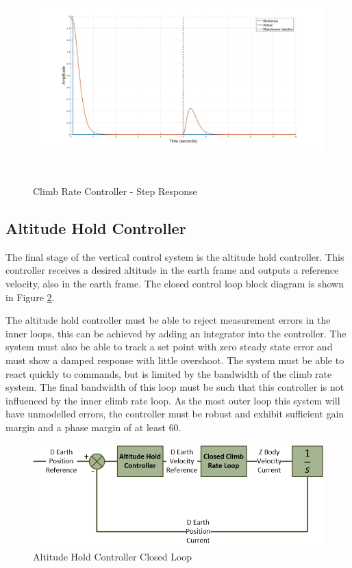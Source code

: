 		 \begin{figure}[H]
		 	\centering
		 	\includegraphics[height = 8cm]{../Design/Matlab/Controllers/climb_rate_step.jpg}
		 	\caption{Climb Rate Controller -  Step Response}
		 	\label{IM_ClimbRateStep}
		 \end{figure}
	 
	 \subsection{Altitude Hold Controller}
	 The final stage of the vertical control system is the altitude hold controller. This controller receives a desired altitude in the earth frame and outputs a reference velocity, also in the earth frame. The closed control loop block diagram is shown in Figure \ref{IM_AltHoldControlLoop}. 
	 
	 The altitude hold controller must be able to reject measurement errors in the inner loops, this can be achieved by adding an integrator into the controller. The system must also be able to track a set point with zero steady state error and must show a damped response with little overshoot. The system must be able to react quickly to commands, but is limited by the bandwidth of the climb rate system. The final bandwidth of this loop must be such that this controller is not influenced by the inner climb rate loop. As the most outer loop this system will have unmodelled errors, the controller must be robust and exhibit sufficient gain margin and a phase margin of at least $60$\textdegree.
	 
	 \begin{figure}[H]
	 	\centering
	 	\includegraphics[height = 4cm]{../References/Diagrams/AltHoldLoop.jpg}
	 	\caption{Altitude Hold Controller Closed Loop}
	 	\label{IM_AltHoldControlLoop}
	 \end{figure}
	 
